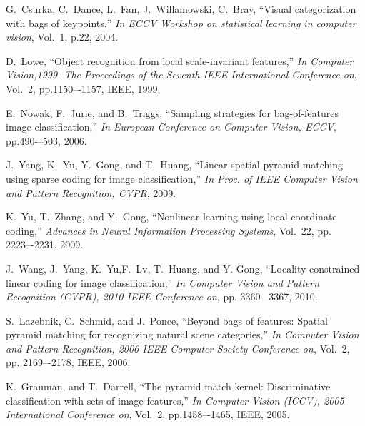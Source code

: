 \documentclass[a4paper,12pt]{article}
\begin{document}

\begin{thebibliography}{9}
G.~Csurka, C.~Dance, L.~Fan, J.~Willamowski, C.~Bray, ``Visual categorization with bags of keypoints,'' \emph{In ECCV Workshop on statistical learning in computer vision}, Vol.~1, p.22, 2004.

D.~Lowe, ``Object recognition from local scale-invariant features,'' \emph{In Computer 
Vision,1999. The Proceedings of the Seventh IEEE International Conference on}, 
Vol.~2, pp.1150–-1157, IEEE, 1999.

E.~Nowak, F.~Jurie, and B.~Triggs, ``Sampling strategies for bag-of-features image classiﬁcation,'' \emph{In European Conference on Computer Vision, ECCV}, pp.490-–503, 2006.

J.~Yang, K.~Yu, Y.~Gong, and T.~Huang, ``Linear spatial pyramid matching using sparse coding for image classiﬁcation,'' \emph{In Proc. of IEEE Computer Vision and Pattern Recognition, CVPR}, 2009.

K.~Yu, T.~Zhang, and Y.~Gong, ``Nonlinear learning using local coordinate coding,'' \emph{Advances in Neural Information Processing Systems}, Vol.~22, pp. 2223–-2231, 2009.

J.~Wang, J.~Yang, K.~Yu,F.~Lv, T.~Huang, and Y. Gong, ``Locality-constrained 
linear coding for image classiﬁcation,'' \emph{ In Computer Vision and Pattern Recognition (CVPR), 2010 IEEE Conference on}, pp. 3360-–3367, 2010.

S.~Lazebnik, C.~Schmid, and J.~Ponce, ``Beyond bags of features: Spatial pyramid matching for recognizing natural scene categories,'' \emph{In Computer Vision and Pattern Recognition, 2006 IEEE Computer Society Conference on}, Vol.~2, 
pp. 2169–-2178, IEEE, 2006.

K.~Grauman, and T.~Darrell, ``The pyramid match kernel: Discriminative classiﬁcation with sets of image features,'' \emph{In Computer Vision (ICCV), 2005 International Conference on}, Vol.~2, pp.1458–-1465, IEEE, 2005.

\end{thebibliography}
\end{document}
